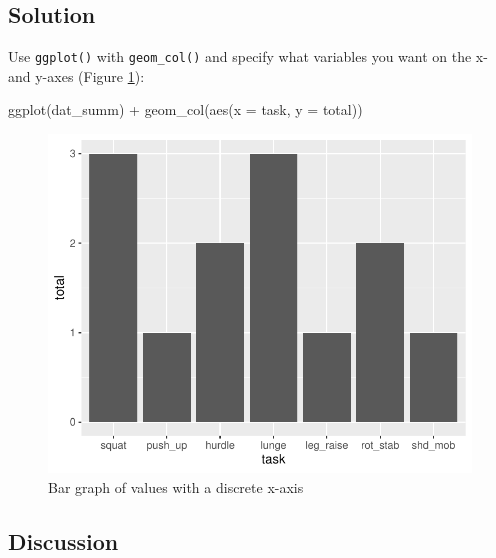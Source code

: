 \documentclass[
]{book}
\newenvironment{Shaded}{\begin{snugshade}}{\end{snugshade}}
\newcommand{\AttributeTok}[1]{\textcolor[rgb]{0.77,0.63,0.00}{#1}}
\newcommand{\FunctionTok}[1]{\textcolor[rgb]{0.00,0.00,0.00}{#1}}
\newcommand{\NormalTok}[1]{#1}
\newcommand{\SpecialCharTok}[1]{\textcolor[rgb]{0.00,0.00,0.00}{#1}}
\begin{document}
\hypertarget{solution-15}{%
\subsection{Solution}\label{solution-15}}

Use \texttt{ggplot()} with \texttt{geom\_col()} and specify what variables you want on the x- and y-axes (Figure \ref{fig:FIG-BAR-GRAPH-BASIC-BAR}):

\begin{Shaded}
\begin{Highlighting}[]

\FunctionTok{ggplot}\NormalTok{(dat\_summ) }\SpecialCharTok{+} 
  \FunctionTok{geom\_col}\NormalTok{(}\FunctionTok{aes}\NormalTok{(}\AttributeTok{x =}\NormalTok{ task, }\AttributeTok{y =}\NormalTok{ total))}
\end{Highlighting}
\end{Shaded}

\begin{figure}

{\centering \includegraphics{se201_stats_book_files/figure-latex/FIG-BAR-GRAPH-BASIC-BAR-1} 

}

\caption[Bar graph of values with a discrete x-axis]{Bar graph of values with a discrete x-axis}\label{fig:FIG-BAR-GRAPH-BASIC-BAR}
\end{figure}

\hypertarget{discussion-8}{%
\subsection{Discussion}\label{discussion-8}}
\end{document}
